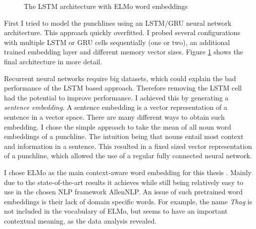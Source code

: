 \documentclass[draft,final,oneside]{vutinfth} %
\begin{document}
\begin{figure}[ht]

	
	\caption{The LSTM architecture with ELMo word embeddings}
	\label{fig:elmolstm}
\end{figure}


First I tried to model the punchlines using an LSTM/GRU neural network architecture. This approach quickly overfitted. I probed several configurations with multiple LSTM or GRU cells sequentially (one or two), an additional trained embedding layer and different memory vector sizes. Figure \ref{fig:elmolstm} shows the final architecture in more detail.

Recurrent neural networks require big datasets, which could explain the bad performance of the LSTM based approach. Therefore removing the LSTM cell had the potential to improve performance. I achieved this by generating a \textit{sentence embedding}. A sentence embedding is a vector representation of a sentence in a vector space. There are many different ways to obtain such embedding. I chose the simple approach to take the mean of all noun word embeddings of a punchline. The intuition being that nouns entail most context and information in a sentence. This resulted in a fixed sized vector representation of a punchline, which allowed the use of a regular fully connected neural network.

I chose ELMo as the main context-aware word embedding for this thesis \cite{elmo}. Mainly due to the state-of-the-art results it achieves while still being relatively easy to use in the chosen NLP framework AllenNLP. An issue of such pretrained word embeddings is their lack of domain specific words. For example, the name \textit{Thag} is not included in the vocabulary of ELMo, but seems to have an important contextual meaning, as the data analysis revealed.
\end{document}
